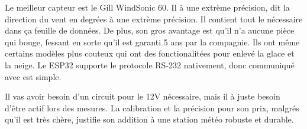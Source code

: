 Le meilleur capteur est le Gill WindSonic 60. Il à une extrème précision, dit la direction du vent en degrées à une extrème précision.
Il contient tout le nécessaire dans ça feuille de données. De plus, son gros avantage est qu'il n'a aucune pièce qui bouge, fessant en
sorte qu'il est garanti 5 ans par la compagnie. Ils ont même certains modèles plus couteux qui ont des fonctionalitées pour enlevé la glace
et la neige. Le ESP32 supporte le protocole RS-232 nativement, donc communiqué avec est simple.

Il vas avoir besoin d'un circuit pour le 12V nécessaire, mais il à juste besoin d'être actif lors des mesures. La calibration et la précision
pour son prix, malgrés qu'il est très chère, justifie son addition à une station météo robuste et durable.


